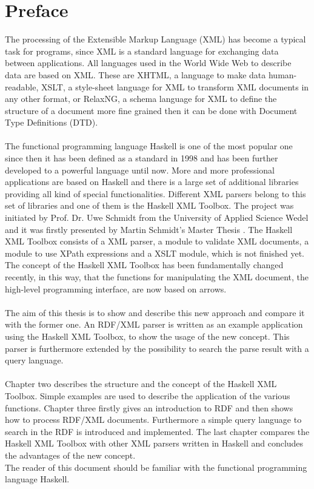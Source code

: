 \documentclass[11pt,a4paper,headsepline, bibtotoc]{scrreprt}
\begin{document}
\chapter{Preface} %
The processing of the Extensible Markup Language (XML) has become a typical task for programs, since XML is a standard language for exchanging data between applications. All languages used in the World Wide Web to describe data are based on XML. These are XHTML, a language to make data human-readable, XSLT, a style-sheet language for XML to transform XML documents in any other format, or RelaxNG, a schema language for XML to define the structure of a document more fine grained then it can be done with Document Type Definitions (DTD).\\\\
The functional programming language Haskell is one of the most popular one since then it has been defined as a standard in 1998 \cite{J:1998} and has been further developed to a powerful language until now. More and more professional applications are based on Haskell and there is a large set of additional libraries providing all kind of special functionalities. Different XML parsers belong to this set of libraries and one of them is the Haskell XML Toolbox. The project was initiated by Prof. Dr. Uwe Schmidt from the University of Applied Science Wedel and it was firstly presented by Martin Schmidt's Master Thesis \cite{Schmidt:2002}. The Haskell XML Toolbox consists of a XML parser, a module to validate XML documents, a module to use XPath expressions and a XSLT module, which is not finished yet. The concept of the Haskell XML Toolbox has been fundamentally changed recently, in this way, that the functions for manipulating the XML document, the high-level programming interface, are now based on arrows.\\
\\
The aim of this thesis is to show and describe this new approach and compare it with the former one. An RDF/XML parser is written as an example application using the Haskell XML Toolbox, to show the usage of the new concept. This parser is furthermore extended by the possibility to search the parse result with a query language.\\\\
Chapter two describes the structure and the concept of the Haskell XML Toolbox. Simple examples are used to describe the application of the various functions. Chapter three firstly gives an introduction to RDF and then shows how to process RDF/XML documents. Furthermore a simple query language to search in the RDF is introduced and implemented. The last chapter compares the Haskell XML Toolbox with other XML parsers written in Haskell and concludes the advantages of the new concept.\\ The reader of this document should be familiar with the functional programming language Haskell. 
\enlargethispage{2cm}
\end{document}
